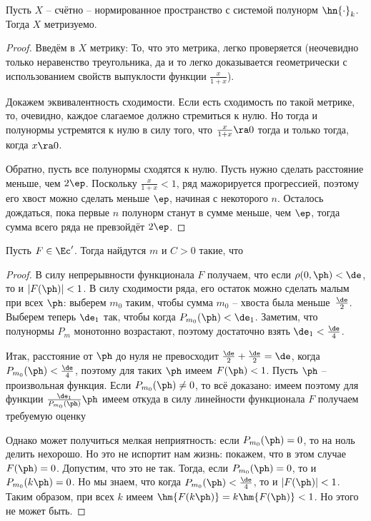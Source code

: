 \documentclass[a4paper]{article}
\begin{document}
\begin{stm}
Пусть $X$ -- счётно -- нормированное пространство с системой полунорм $\hn{\cdot}_k$. Тогда $X$ метризуемо.
\end{stm}
\begin{proof}
Введём в $X$ метрику:
То, что это метрика, легко проверяется (неочевидно только неравенство треугольника,
да и то легко доказывается геометрически с использованием свойств выпуклости функции $\frac{x}{1+x}$).

Докажем эквивалентность сходимости. Если есть сходимость по такой метрике,
то, очевидно, каждое слагаемое должно стремиться к нулю. Но тогда и полунормы устремятся
к нулю в силу того, что $\frac{x}{1+x} \ra 0$ тогда и только тогда, когда $x \ra 0$.

Обратно, пусть все полунормы сходятся к нулю. Пусть нужно сделать
расстояние меньше, чем $2\ep$. Поскольку $\frac{x}{1+x} < 1$,
ряд мажорируется прогрессией, поэтому его хвост можно сделать меньше $\ep$, начиная с некоторого $n$.
Осталось дождаться, пока первые $n$ полунорм станут в сумме меньше, чем $\ep$, тогда сумма всего
ряда не превзойдёт $2\ep$.
\end{proof}

\begin{stm}
Пусть $F \in \Ec'$. Тогда найдутся $m$ и $C> 0$ такие, что
\end{stm}
\begin{proof}
В силу непрерывности функционала $F$ получаем, что если $\rho(0,\ph) < \de$, то и $|F(\ph)| < 1$.
В силу сходимости ряда, его остаток можно сделать малым при всех $\ph$: выберем $m_0$ таким,
чтобы сумма $m_0$ -- хвоста была меньше~$\frac{\de}{2}$.
Выберем теперь $\de_1$ так, чтобы
когда $P_{m_0}(\ph) < \de_1$. Заметим, что полунормы $P_m$ монотонно возрастают,
поэтому достаточно взять $\de_1 < \frac{\de}{4}$.

Итак, расстояние от $\ph$ до нуля не превосходит $\frac{\de}{2} + \frac\de2 = \de$,
когда $P_{m_0}(\ph) < \frac{\de}{4}$, поэтому для таких $\ph$ имеем $F(\ph) < 1$.
Пусть $\ph$ -- произвольная функция. Если $P_{m_0}(\ph) \neq 0$, то всё доказано:
имеем
поэтому для функции $\frac{\de_1}{P_{m_0}(\ph)}\ph$ имеем
откуда в силу линейности функционала $F$ получаем требуемую оценку

Однако может получиться мелкая неприятность: если $P_{m_0}(\ph) = 0$, то на ноль делить нехорошо.
Но это не испортит нам жизнь: покажем, что в этом случае $F(\ph) = 0$.
Допустим, что это не так. Тогда, если $P_{m_0}(\ph) = 0$, то и $P_{m_0}(k\ph) = 0$.
Но мы знаем, что когда $P_{m_0}(\ph) < \frac{\de}{4}$, то и $|F(\ph)| < 1$.
Таким образом, при всех $k$ имеем $\hm{F(k\ph)} = k\hm{F(\ph)} < 1$. Но этого не может быть.
\end{proof}
\end{document}
